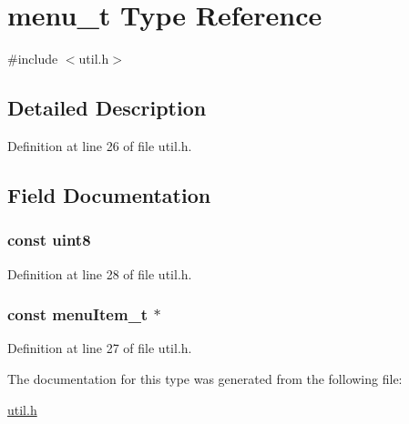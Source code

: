 \hypertarget{typemenu__t}{
\section{menu\_\-t Type Reference}
\label{typemenu__t}
}


{\ttfamily \#include $<$util.h$>$}

\par
\par


\subsection{Detailed Description}


Definition at line 26 of file util.h.



\subsection{Field Documentation}
\hypertarget{typemenu__t_af371b515a1370bca919684a408539f7b}{
\subsubsection[{nItems}]{ {\bfseries const uint8 } }}
\label{typemenu__t_af371b515a1370bca919684a408539f7b}


Definition at line 28 of file util.h.

\hypertarget{typemenu__t_a105d0bb30a10b52f097777a30f60f285}{
\subsubsection[{pMenuItems}]{ {\bfseries const menuItem\_\-t $\ast$ } }}
\label{typemenu__t_a105d0bb30a10b52f097777a30f60f285}


Definition at line 27 of file util.h.



The documentation for this type was generated from the following file:\begin{DoxyCompactItemize}
\item 
\hyperlink{util_8h}{util.h}\end{DoxyCompactItemize}
